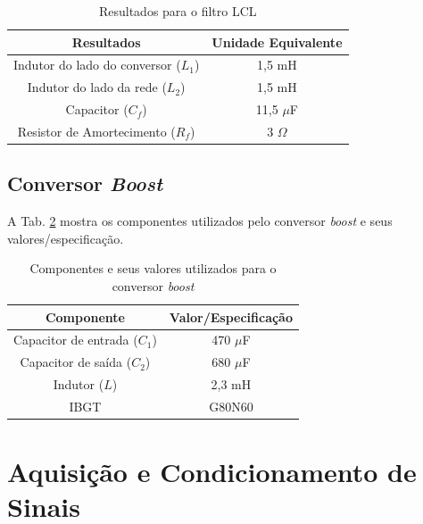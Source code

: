\begin{table}[h]
	\centering
	\caption{Resultados para o filtro LCL}
	\label{tab:resultados-filtro-lcl}
	
	\begin{tabular}{cc}
		\toprule
		\textbf{Resultados} & \textbf{Unidade Equivalente} \\
		\midrule
		Indutor do lado do conversor ($L_1$) & 1,5 mH \\
		Indutor do lado da rede ($L_2$) & 1,5 mH \\
		Capacitor ($C_f$) & 11,5 $\mu$F \\
		Resistor de Amortecimento ($R_f$) & 3 $\Omega$ \\
		\bottomrule
	\end{tabular}
\end{table}

\subsection{Conversor \textit{Boost}}

A Tab. \ref{tab:conversor-boost-componentes} mostra os componentes utilizados pelo 
conversor \textit{boost} e seus valores/especificação.

\begin{table}
	\centering
	\caption{Componentes e seus valores utilizados para o conversor \textit{boost}}
	\label{tab:conversor-boost-componentes}
	\begin{tabular}{cc}
		\toprule
		\textbf{Componente} & \textbf{Valor/Especificação} \\
		\midrule
		Capacitor de entrada ($C_1$) & 470 $\mu$F \\
		Capacitor de saída ($C_2$) & 680 $\mu$F \\
		Indutor ($L$)& 2,3 mH \\
		IBGT & G80N60 \\
		\bottomrule
	\end{tabular}

\end{table}

\section{Aquisição e Condicionamento de Sinais}

